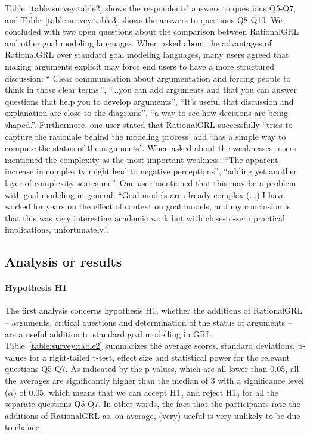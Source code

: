 Table~\ref{table:survey:table2} shows the respondents' answers to questions Q5-Q7, and Table~\ref{table:survey:table3} shows the answers to questions Q8-Q10. We concluded with two open questions about the comparison between RationalGRL and other goal modeling languages. When asked about the advantages of RationalGRL over standard goal modeling languages, many users agreed that making arguments explicit may force end users to have a more structured discussion: ``	Clear communication about argumentation and forcing people to think in those clear terms.'', ``...you can add arguments and that you can answer questions that help you to develop arguments'', ``It's useful that discussion and explanation are close to the diagrams'', ``a way to see how decisions are being shaped.''. Furthermore, one user stated that RationalGRL successfully ``tries to capture the rationale behind the modeling process' and ``has a simple way to compute the status of the arguments''. When asked about the weaknesses, users mentioned the complexity as the most important weakness: ``The apparent increase in complexity might lead to negative perceptions'', ``adding yet another layer of complexity scares me''. One user mentioned that this may be a problem with goal modeling in general: ``Goal models are already complex (...) I have worked for years on the effect of context on goal models, and my conclusion is that this was very interesting academic work but with close-to-zero practical implications, unfortunately.''.

\subsection{Analysis or results}\label{sect:validation:analysis}

\paragraph{Hypothesis H1}
The first analysis concerns hypothesis H1, whether the additions of RationalGRL -- arguments, critical questions and determination of the status of arguments -- are a useful addition to standard goal modelling in GRL. Table~\ref{table:survey:table2} summarizes the average scores, standard deviations, p-values for a right-tailed t-test, effect size and statistical power for the relevant questions Q5-Q7. As indicated by the p-values, which are all lower than 0.05, all the averages are significantly higher than the median of 3 with a significance level ($\alpha$) of 0.05, which means that we can accept H1$_{a}$ and reject H1$_{0}$ for all the separate questions Q5-Q7. In other words, the fact that the participants rate the additions of RationalGRL as, on average, (very) useful is very unlikely to be due to chance. 


